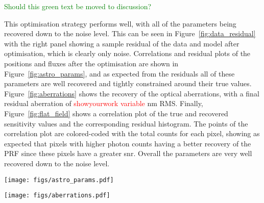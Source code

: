 \documentclass[twocolumn]{spie}
\begin{document}
\textcolor{green}{Should this green text be moved to discussion?}

This optimisation strategy performs well, with all of the parameters being recovered down to the noise level. This can be seen in Figure~\ref{fig:data_residual} with the right panel showing a sample residual of the data and model after optimisation, which is clearly only noise. Correlations and residual plots of the positions and fluxes after the optimisation are shown in Figure~\ref{fig:astro_params}, and as expected from the residuals all of these parameters are well recovered and tightly constrained around their true values. Figure~\ref{fig:aberrations} shows the recovery of the optical aberrations, with a final residual aberration of \textcolor{red}{showyourwork variable} nm RMS. Finally, Figure~\ref{fig:flat_field} shows a correlation plot of the true and recovered sensitivity values and the corresponding residual histogram. The points of the correlation plot are colored-coded with the total counts for each pixel, showing as expected that pixels with higher photon counts having a better recovery of the PRF since these pixels have a greater \ac{snr}. Overall the parameters are very well recovered down to the noise level.


\begin{figure*}
    \centering
    \texttt{[image: figs/astro\_params.pdf]}
    \caption{The left panel shows the recovery of the individual RA-Dec positions of each star, with the top section showing the correlation between the true and recovered values in units of arcseconds. The bottom section shows the individual residuals for each. Clearly these parameters have been well recovered through the optimisation. The right panel shows the recovery of the flux parameters in units of photons. The top section shows the correlation between the true and recovered values, and the bottom showing the resulting residuals. \textcolor{red}{Should we address the slight overestimation of fluxes due to the PRF values being a relative measure so a small global covaraince is present?}}
    \label{fig:astro_params}
\end{figure*}

\begin{figure*}
    \centering
    \texttt{[image: figs/aberrations.pdf]}
    \caption{This figure shows the recovery of the optical aberrations after optimisation. The left panel shows the amplitudes of the Zernike polynomial coefficients, with the top section showing the correlation plot of the true and recovered values, and the bottom showing the individual residuals. The middle and right panels show the the true total \ac{opd} and the residuals generated by these values respectively.}
    \label{fig:aberrations}
\end{figure*}
\end{document}
